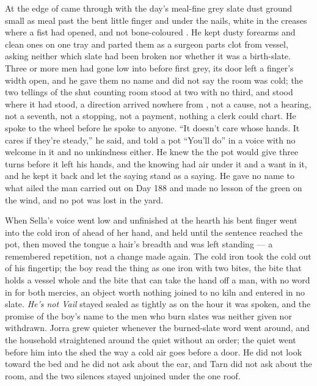 \scenebreak

At the edge of   came through with the day's meal-fine grey slate dust ground small as meal past the bent little finger and under the nails, white in the creases where a fist had opened, and not bone-coloured . He kept dusty forearms and clean ones on one tray and parted them as a surgeon parts clot from vessel, asking neither which slate had been broken nor whether it was a birth-slate. Three or more men had gone low into  before first grey, its door left a finger's width open, and he gave them no name and did not say the room was cold; the two tellings of the shut counting room stood at two with no third, and  stood where it had stood, a direction arrived nowhere from , not a cause, not a hearing, not a seventh, not a stopping, not a payment, nothing a clerk could chart. He spoke to the wheel before he spoke to anyone. “It doesn't care whose hands. It cares if they're steady,” he said, and told a pot “You'll do” in a voice with no welcome in it and no unkindness either. He knew the  the pot would give three turns before it left his hands, and the knowing had air under it and a want in it, and he kept it back and let the saying stand as a saying. He gave no name to what ailed the man carried out on Day 188 and made no lesson of the green on the wind, and no pot was lost in the yard.

When Sella's voice went low and unfinished at the hearth his bent finger went into the cold iron of  ahead of her hand, and held until the sentence reached the pot, then moved the tongue a hair's breadth and was left standing --- a remembered repetition, not a change made again. The cold iron took the cold out of his fingertip; the boy read the thing as one iron with two bites, the bite that holds a vessel whole and the bite that can take the hand off a man, with no word in  for both mercies, an object worth nothing joined to no kiln and entered in no slate. \emph{He's not Vail} stayed sealed as tightly as on the hour it was spoken, and the promise of the boy's name to the men who burn slates was neither given nor withdrawn. Jorra grew quieter whenever the burned-slate word went around, and the household straightened around the quiet without an order; the quiet went before him into the shed the way a cold air goes before a door. He did not look toward the bed and he did not ask about the ear, and Tarn did not ask about the room, and the two silences stayed unjoined under the one roof.


